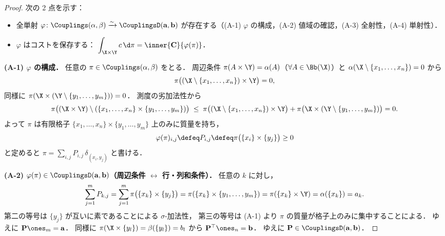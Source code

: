 \begin{proof}
  次の 2 点を示す：
  \begin{itemize}
    \item[(A)] 全単射 $\varphi \colon \Couplings(\alpha,\beta) \xrightarrow{\sim} \CouplingsD(\mathbf{a},\mathbf{b})$
      が存在する（(A-1) $\varphi$ の構成，(A-2) 値域の確認，(A-3) 全射性，(A-4) 単射性）．
    \item[(B)] $\varphi$ はコストを保存する：
      $\displaystyle\int_{\X\times\Y} c\,\d\pi = \inner{\mathbf{C}}{\varphi(\pi)}$．
  \end{itemize}
  \medskip
  \textbf{(A-1) $\varphi$ の構成．}
  任意の $\pi \in \Couplings(\alpha, \beta)$ をとる．
  周辺条件 $\pi(A \times \Y) = \alpha(A)$（$\forall A \in \Bb(\X)$）と
  $\alpha(\X \setminus \{x_1,\ldots,x_n\}) = 0$ から
  \[
    \pi\bigl((\X \setminus \{x_1,\ldots,x_n\}) \times \Y\bigr) = 0,
  \]
  同様に $\pi(\X \times (\Y \setminus \{y_1,\ldots,y_m\})) = 0$．
  測度の劣加法性から
  \[
    \pi\bigl((\X\times\Y)\setminus(\{x_1,\ldots,x_n\}\times\{y_1,\ldots,y_m\})\bigr)
    \;\leq\;
    \pi\bigl((\X\setminus\{x_1,\ldots,x_n\})\times\Y\bigr)
    + \pi\bigl(\X\times(\Y\setminus\{y_1,\ldots,y_m\})\bigr) = 0.
  \]
  よって $\pi$ は有限格子 $\{x_1,\ldots,x_n\} \times \{y_1,\ldots,y_m\}$ 上のみに質量を持ち，
  \[
    \varphi(\pi)_{i,j} \defeq P_{i,j} \defeq \pi\bigl(\{x_i\} \times \{y_j\}\bigr) \geq 0
  \]
  と定めると $\pi = \sum_{i,j} P_{i,j}\, \delta_{(x_i, y_j)}$ と書ける．

  \medskip
  \textbf{(A-2) $\varphi(\pi) \in \CouplingsD(\mathbf{a},\mathbf{b})$（周辺条件 $\leftrightarrow$ 行・列和条件）．}
  任意の $k$ に対し，
  \[
    \sum_{j=1}^m P_{k,j}
    = \sum_{j=1}^m \pi\bigl(\{x_k\} \times \{y_j\}\bigr)
    = \pi\!\left(\{x_k\} \times \{y_1,\ldots,y_m\}\right)
    = \pi(\{x_k\} \times \Y)
    = \alpha(\{x_k\}) = a_k.
  \]
  第二の等号は $\{y_j\}$ が互いに素であることによる $\sigma$-加法性，
  第三の等号は (A-1) より $\pi$ の質量が格子上のみに集中することによる．
  ゆえに $\mathbf{P}\ones_m = \mathbf{a}$．
  同様に $\pi(\X \times \{y_l\}) = \beta(\{y_l\}) = b_l$ から $\mathbf{P}^\top\ones_n = \mathbf{b}$．
  ゆえに $\mathbf{P} \in \CouplingsD(\mathbf{a},\mathbf{b})$．


\end{proof}
